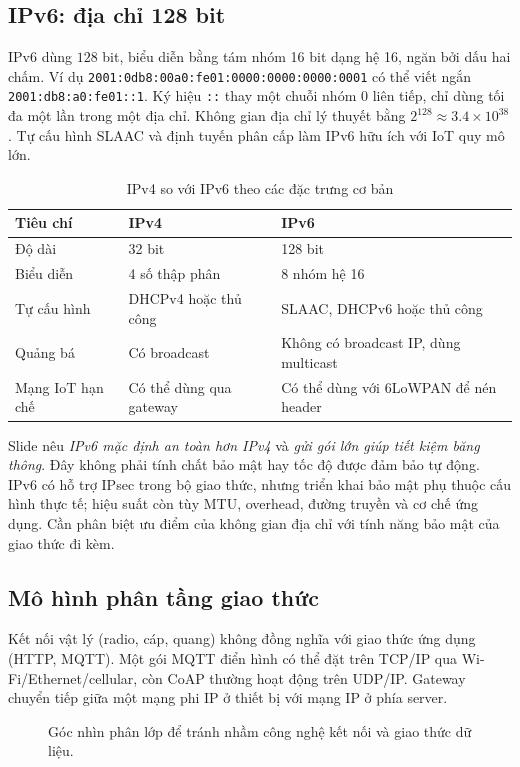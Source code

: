 \subsection{IPv6: địa chỉ 128 bit}
IPv6 dùng \(128\) bit, biểu diễn bằng tám nhóm 16 bit dạng hệ 16, ngăn bởi dấu hai chấm. Ví dụ \texttt{2001:0db8:00a0:fe01:0000:0000:0000:0001} có thể viết ngắn \texttt{2001:db8:a0:fe01::1}. Ký hiệu \texttt{::} thay một chuỗi nhóm 0 liên tiếp, chỉ dùng tối đa một lần trong một địa chỉ. Không gian địa chỉ lý thuyết bằng \(2^{128}\approx3.4\times10^{38}\). Tự cấu hình SLAAC và định tuyến phân cấp làm IPv6 hữu ích với IoT quy mô lớn.
\begin{table}[htbp]\centering\small\caption{IPv4 so với IPv6 theo các đặc trưng cơ bản}
\begin{tabularx}{\textwidth}{@{}p{33mm}X X@{}}\toprule
\textbf{Tiêu chí}&\textbf{IPv4}&\textbf{IPv6}\\\midrule
Độ dài & 32 bit & 128 bit\\
Biểu diễn & 4 số thập phân & 8 nhóm hệ 16\\
Tự cấu hình & DHCPv4 hoặc thủ công & SLAAC, DHCPv6 hoặc thủ công\\
Quảng bá & Có broadcast & Không có broadcast IP, dùng multicast\\
Mạng IoT hạn chế & Có thể dùng qua gateway & Có thể dùng với 6LoWPAN để nén header\\\bottomrule
\end{tabularx}
\end{table}
\begin{note}
Slide nêu \emph{IPv6 mặc định an toàn hơn IPv4} và \emph{gửi gói lớn giúp tiết kiệm băng thông}. Đây không phải tính chất bảo mật hay tốc độ được đảm bảo tự động. IPv6 có hỗ trợ IPsec trong bộ giao thức, nhưng triển khai bảo mật phụ thuộc cấu hình thực tế; hiệu suất còn tùy MTU, overhead, đường truyền và cơ chế ứng dụng. Cần phân biệt ưu điểm của không gian địa chỉ với tính năng bảo mật của giao thức đi kèm.
\end{note}
\subsection{Mô hình phân tầng giao thức}
Kết nối vật lý (radio, cáp, quang) không đồng nghĩa với giao thức ứng dụng (HTTP, MQTT). Một gói MQTT điển hình có thể đặt trên TCP/IP qua Wi-Fi/Ethernet/cellular, còn CoAP thường hoạt động trên UDP/IP. Gateway chuyển tiếp giữa một mạng phi IP ở thiết bị với mạng IP ở phía server.
\begin{figure}[htbp]\centering
{}\caption{Góc nhìn phân lớp để tránh nhầm công nghệ kết nối và giao thức dữ liệu.}
\end{figure}